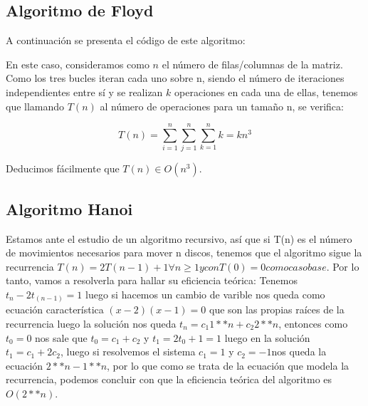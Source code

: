 \documentclass{homework}
\begin{document}
    \subsection{Algoritmo de Floyd}

    A continuación se presenta el código de este algoritmo:

    

    En este caso, consideramos como $n$ el número de filas/columnas de la matriz. Como los tres bucles iteran cada uno sobre n, siendo el número de iteraciones
    independientes entre sí y se realizan $k$ operaciones en cada una de ellas, tenemos que llamando $T(n)$ al número de operaciones para un tamaño n, se verifica:
    
    \begin{equation*}
        T(n) = \sum_{i=1}^n \sum_{j=1}^{n} \sum_{k=1}^{n} k = kn^3
    \end{equation*}

    Deducimos fácilmente que $T(n) \in O(n^3)$. 
    
    \subsection{Algoritmo Hanoi}
    
     

    Estamos ante el estudio de un algoritmo recursivo, así que si T(n) es el número de movimientos necesarios para mover n discos, tenemos que el algoritmo sigue la 
    recurrencia $T(n) = 2T(n-1) + 1 \forall n \geq 1 y con T(0) = 0 como caso base$. Por lo tanto, vamos a resolverla para hallar su eficiencia teórica:
    Tenemos $t_n - 2t_(n-1) = 1 $ luego si hacemos un cambio de varible nos queda como ecuación característica $(x-2)(x-1) = 0$  que son las propias raíces de la 
    recurrencia luego la solución nos queda $t_n = c_1 1**n  + c_2 2**n  $, entonces como $t_0=0$ nos sale que $t_0 = c_1 + c_2$ y $t_1 = 2 t_0 + 1 = 1$ luego en la 
    solución $t_1=c_1 + 2 c_2 $, luego si resolvemos el sistema $c_1 = 1$ y $c_2 = -1$nos queda la ecuación $2**n - 1**n$, por lo que como se trata de la ecuación que 
    modela la recurrencia, podemos concluir con que la eficiencia teórica del algoritmo es $O(2**n)$.
\end{document}
